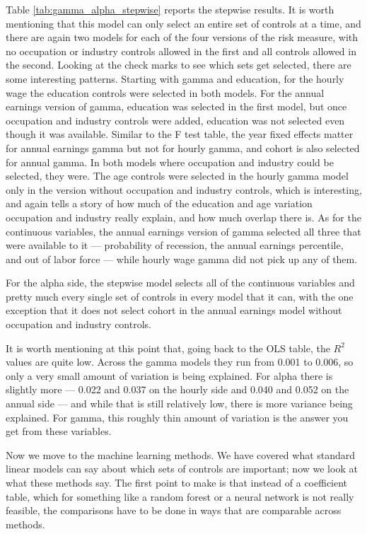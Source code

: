 \documentclass[12pt]{article}
\begin{document}
\begin{onehalfspace}
Table \ref{tab:gamma_alpha_stepwise} reports the stepwise results. It is worth mentioning that this model can only select an entire set of controls at a time, and there are again two models for each of the four versions of the risk measure, with no occupation or industry controls allowed in the first and all controls allowed in the second. Looking at the check marks to see which sets get selected, there are some interesting patterns. Starting with gamma and education, for the hourly wage the education controls were selected in both models. For the annual earnings version of gamma, education was selected in the first model, but once occupation and industry controls were added, education was not selected even though it was available. Similar to the F test table, the year fixed effects matter for annual earnings gamma but not for hourly gamma, and cohort is also selected for annual gamma. In both models where occupation and industry could be selected, they were. The age controls were selected in the hourly gamma model only in the version without occupation and industry controls, which is interesting, and again tells a story of how much of the education and age variation occupation and industry really explain, and how much overlap there is. As for the continuous variables, the annual earnings version of gamma selected all three that were available to it --- probability of recession, the annual earnings percentile, and out of labor force --- while hourly wage gamma did not pick up any of them.



For the alpha side, the stepwise model selects all of the continuous variables and pretty much every single set of controls in every model that it can, with the one exception that it does not select cohort in the annual earnings model without occupation and industry controls.

It is worth mentioning at this point that, going back to the OLS table, the $R^2$ values are quite low. Across the gamma models they run from 0.001 to 0.006, so only a very small amount of variation is being explained. For alpha there is slightly more --- 0.022 and 0.037 on the hourly side and 0.040 and 0.052 on the annual side --- and while that is still relatively low, there is more variance being explained. For gamma, this roughly thin amount of variation is the answer you get from these variables.

Now we move to the machine learning methods. We have covered what standard linear models can say about which sets of controls are important; now we look at what these methods say. The first point to make is that instead of a coefficient table, which for something like a random forest or a neural network is not really feasible, the comparisons have to be done in ways that are comparable across methods.


\end{onehalfspace}
\end{document}

